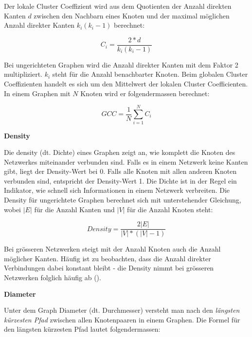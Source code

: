 Der lokale Cluster Coeffizient wird aus dem Quotienten der Anzahl direkten Kanten $d$ zwischen den Nachbarn eines Knoten und der maximal möglichen Anzahl direkter Kanten $k_i(k_i -1)$ berechnet:

\begin{equation}
    \label{eq:ci}
    C_i = \frac{2*d}{k_i(k_i-1)}
\end{equation}


Bei ungerichteten Graphen wird die Anzahl direkter Kanten mit dem Faktor 2 multipliziert. $k_i$ steht für die Anzahl benachbarter Knoten.
Beim globalen Cluster Coeffizienten handelt es sich um den Mittelwert der lokalen Cluster Coefficienten.
In einem Graphen mit $N$ Knoten wird er folgendermassen berechnet:

\begin{equation}
    \label{eq:gcc}
    GCC = \frac{1}{N}\sum\limits_{i=1}^{N}C_i
\end{equation}

\textbf{Density}

Die \acs{density} (dt. Dichte) eines Graphen zeigt an, wie komplett die Knoten des Netzwerkes miteinander verbunden sind.
Falls es in einem Netzwerk keine Kanten gibt, liegt der Density-Wert bei 0. Falls alle Knoten mit allen anderen Knoten verbunden sind, entspricht der Density-Wert 1.
Die Dichte ist in der Regel ein Indikator, wie schnell sich Informationen in einem Netzwerk verbreiten.
Die Density für ungerichtete Graphen berechnet sich mit unterstehender Gleichung, wobei $|E|$ für die Anzahl Kanten und $|V|$ für die Anzahl Knoten steht:

\begin{equation}
    \label{eq:density}
    Density = \frac{2|E|}{|V|*(|V|-1)}
\end{equation}


Bei grösseren Netzwerken steigt mit der Anzahl Knoten auch die Anzahl möglicher Kanten.
Häufig ist zu beobachten, dass die Anzahl direkter Verbindungen dabei konstant bleibt - die Density nimmt bei grösseren Netzwerken folglich häufig ab (\cite{michael_henninger_soziale_2018}).

\textbf{Diameter}

Unter dem Graph Diameter (dt. Durchmesser) versteht man nach \cite{michael_henninger_soziale_2018} den \textit{längsten kürzesten Pfad} zwischen allen Knotenpaaren in einem Graphen.
Die Formel für den längsten kürzesten Pfad lautet folgendermassen:

